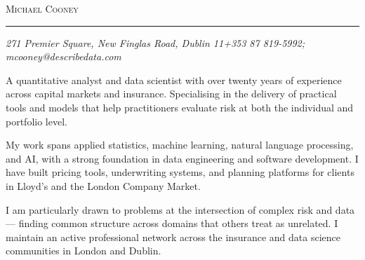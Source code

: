 \documentclass[11pt,a4paper,oneside]{article}
\makeatletter
\newcommand{\name}{Michael Cooney}
\newcommand{\addr}{271 Premier Square, New Finglas Road, Dublin 11}
\newcommand{\phone}{+353 87 819-5992}
\newcommand{\email}{mcooney@describedata.com}
\newcommand{\bigname}[1]{
  \begin{center}\Huge\scshape#1\end{center}
}
\makeatother
\begin{document}
\bigname{\name}

\vspace{-8pt} \rule{\textwidth}{1pt}

\vspace{-1pt} {\small\itshape \addr \hfill \phone; \email}

\vspace{8pt}

A quantitative analyst and data scientist with over twenty years of experience
across capital markets and insurance. Specialising in the delivery of practical
tools and models that help practitioners evaluate risk at both the individual
and portfolio level.

\vspace{6pt}

My work spans applied statistics, machine learning, natural language processing,
and AI, with a strong foundation in data engineering and software development. I
have built pricing tools, underwriting systems, and planning platforms for
clients in Lloyd's and the London Company Market.

\vspace{6pt}

I am particularly drawn to problems at the intersection of complex risk and data
— finding common structure across domains that others treat as unrelated. I
maintain an active professional network across the insurance and data science
communities in London and Dublin.

\vspace{4pt}



\end{document}
